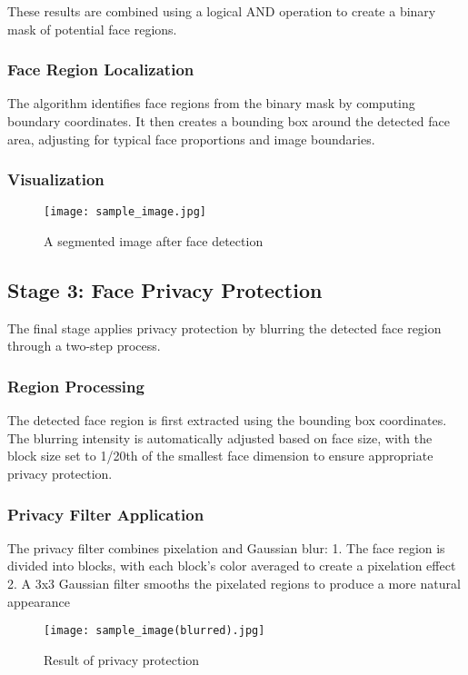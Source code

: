 \documentclass[12pt,a4paper]{article}
\begin{document}
These results are combined using a logical AND operation to create a binary mask of potential face regions.

\subsubsection{Face Region Localization}
The algorithm identifies face regions from the binary mask by computing boundary coordinates. It then creates a bounding box around the detected face area, adjusting for typical face proportions and image boundaries.

\subsubsection{Visualization}
\begin{figure}[h]
    \centering
    \texttt{[image: sample\_image.jpg]}
    \caption{A segmented image after face detection}
    \label{fig:segmented_image}
\end{figure}

\subsection{Stage 3: Face Privacy Protection}
The final stage applies privacy protection by blurring the detected face region through a two-step process.

\subsubsection{Region Processing}
The detected face region is first extracted using the bounding box coordinates. The blurring intensity is automatically adjusted based on face size, with the block size set to 1/20th of the smallest face dimension to ensure appropriate privacy protection.

\subsubsection{Privacy Filter Application}
The privacy filter combines pixelation and Gaussian blur:
1. The face region is divided into blocks, with each block's color averaged to create a pixelation effect
2. A 3x3 Gaussian filter smooths the pixelated regions to produce a more natural appearance

\begin{figure}[h]
    \centering
    \texttt{[image: sample\_image(blurred).jpg]}
    \caption{Result of privacy protection}
    \label{fig:privacy_protection}
\end{figure}
\end{document}
